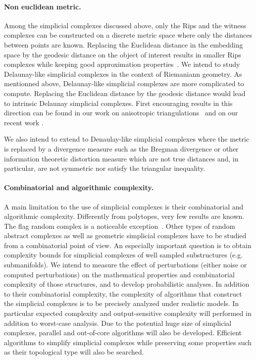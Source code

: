 \paragraph{Non euclidean metric.}
Among the simplicial complexes discussed above, only the Rips and the witness complexes can be constructed on a discrete metric space where only the distances between points are known. 
Replacing the Euclidean distance in the embedding space by the geodesic distance on the object of interest results in smaller Rips complexes while keeping good approximation properties~\cite{dl-clt-2009}. We intend to study Delaunay-like simplicial complexes in the context of Riemaniann geometry. 
As mentionned above, Delaunay-like simplicial complexes are more complicated to compute. Replacing the Euclidean distance by  the geodesic distance would lead to intrinsic Delaunay simplicial complexes. First encouraging results in this direction can be found in our work on anisotropic triangulations~\cite{bwy-luam-08} and on our recent work \cite{boissonnat2012stab}. 


We also intend to extend to Denaulay-like simplicial complexes where the metric is replaced by a divergence measure such as the Bregman divergence or other information theoretic distortion measure which are not true distances and, in particular, are not symmetric nor satisfy the triangular inequality.


\paragraph{Combinatorial and algorithmic complexity.}
A main limitation to the use of simplicial complexes is their combinatorial and algorithmic complexity.  Differently from polytopes, very few results are known. The flag random complex is a noticeable exception~\cite{CambridgeJournals:2077252}. Other types of random abstract complexes as well as geometric simplicial complexes have to be studied from a combinatorial point of view. An especially important question is to obtain complexity bounds for simplicial complexes of well sampled substructures (e.g. submanifolds).  We intend to measure the effect of perturbations (either noise or computed perturbations) on the mathematical properties and combinatorial complexity of those structures, and to develop probabilistic analyses. In addition to their combinatorial complexity, the complexity of algorithms that construct the simplicial complexes is to be precisely analyzed under realistic models. In particular expected complexity and output-sensitive complexity will performed in addition to worst-case analysis. Due to the potential huge size of simplicial complexes, parallel and out-of-core algorithms will also be developed. Efficient algorithms to simplify simplicial complexes while preserving some properties such as their topological type will also be searched.


